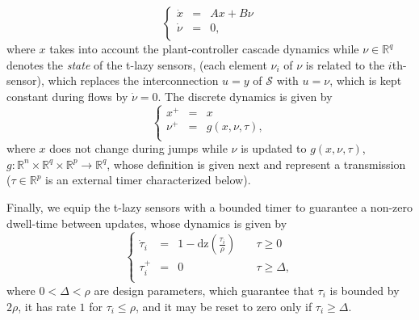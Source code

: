 \documentclass[twocolumn]{autart}
\newcommand{\realn}{\real^n}
\newcommand\real{\ensuremath{{\mathbb R}}}
\newcommand\dz{\mathrm{dz}}
\begin{document}
\begin{equation}
\label{eq:lazy_sys_flow}
	\left\{ \begin{array}{lll}
		\dot{x} &=& Ax + B \nu  \\
		\dot{\nu} &=& 0, \\
	 \end{array}\right.  
\end{equation}
where $x$ takes into account the plant-controller 
cascade dynamics while $\nu\in\real^q$ denotes the \emph{state} of the
t-lazy sensors, (each element $\nu_i$ of $\nu$ is 
related to the $i$th-sensor), which replaces 
the interconnection $u=y$ of $\mathcal{S}$ with $u=\nu$, 
which is kept constant during flows by $\dot{\nu} = 0$. The discrete dynamics is given by
\begin{equation}
\label{eq:lazy_sys_jump}
	\left\{ \begin{array}{lll}
		x^+ &=& x  \\
		\nu^+ &=& g(x,\nu,\tau), \\
	\end{array}\right.  
\end{equation}
where $x$ does not change during jumps 
while $\nu$ is updated to $g(x,\nu,\tau)$, 
$g:\realn\times\real^q\times\real^p\to \real^q$,
whose definition is given next and represent a transmission 
($\tau\in \real^p$ is an external timer characterized below). 

Finally, we equip the t-lazy sensors with a bounded timer to guarantee 
a non-zero dwell-time between updates, whose dynamics is given by
\begin{equation}
\label{eq:lazy_sys_timer}
	\left\{ \begin{array}{llll}
		\dot{\tau}_i &=& 1-\dz(\frac{\tau_i}{\rho} ) 
		& \quad\tau \geq 0 \\
		\tau_i^+ &=& 0 
                & \quad\tau \geq \Delta,\\
	\end{array}\right. 
\end{equation}
where $0<\Delta< \rho$ are design parameters, 
which guarantee 
that $\tau_i$ is bounded by $2\rho$, it has
rate $1$ for $\tau_i \leq \rho$, and it
may be reset to zero only if $\tau_i \geq \Delta$.
\end{document}
